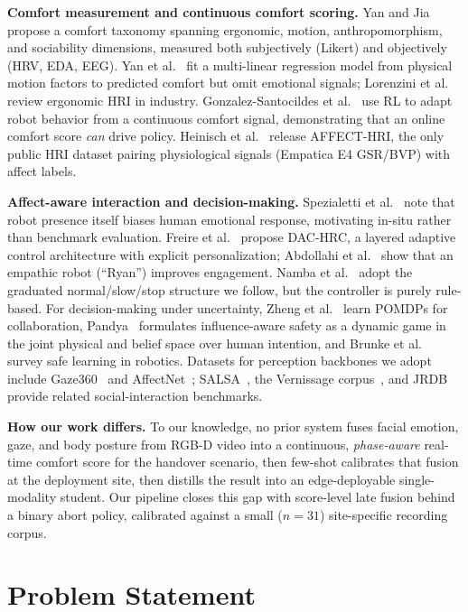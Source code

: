 \documentclass{article}
\begin{document}
\textbf{Comfort measurement and continuous comfort scoring.} Yan and Jia~\cite{ref04} propose a comfort taxonomy spanning ergonomic, motion, anthropomorphism, and sociability dimensions, measured both subjectively (Likert) and objectively (HRV, EDA, EEG). Yan et al.~\cite{ref05} fit a multi-linear regression model from physical motion factors to predicted comfort but omit emotional signals; Lorenzini et al.~\cite{ref06} review ergonomic HRI in industry. Gonzalez-Santocildes et al.~\cite{ref08} use RL to adapt robot behavior from a continuous comfort signal, demonstrating that an online comfort score \emph{can} drive policy. Heinisch et al.~\cite{ref09} release AFFECT-HRI, the only public HRI dataset pairing physiological signals (Empatica E4 GSR/BVP) with affect labels.

\textbf{Affect-aware interaction and decision-making.} Spezialetti et al.~\cite{ref10} note that robot presence itself biases human emotional response, motivating in-situ rather than benchmark evaluation. Freire et al.~\cite{ref11} propose DAC-HRC, a layered adaptive control architecture with explicit personalization; Abdollahi et al.~\cite{ref12} show that an empathic robot (``Ryan'') improves engagement. Namba et al.~\cite{ref13} adopt the graduated normal/slow/stop structure we follow, but the controller is purely rule-based. For decision-making under uncertainty, Zheng et al.~\cite{ref14} learn POMDPs for collaboration, Pandya~\cite{ref15} formulates influence-aware safety as a dynamic game in the joint physical and belief space over human intention, and Brunke et al.~\cite{ref17} survey safe learning in robotics. Datasets for perception backbones we adopt include Gaze360~\cite{ref25} and AffectNet~\cite{ref26}; SALSA~\cite{ref22}, the Vernissage corpus~\cite{ref23}, and JRDB~\cite{ref24} provide related social-interaction benchmarks.

\textbf{How our work differs.} To our knowledge, no prior system fuses facial emotion, gaze, and body posture from RGB-D video into a continuous, \emph{phase-aware} real-time comfort score for the handover scenario, then few-shot calibrates that fusion at the deployment site, then distills the result into an edge-deployable single-modality student. Our pipeline closes this gap with score-level late fusion behind a binary abort policy, calibrated against a small ($n=31$) site-specific recording corpus.

\section{Problem Statement}
\end{document}
